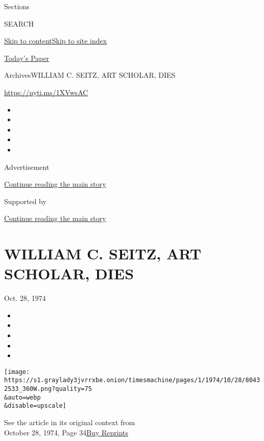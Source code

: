 Sections

SEARCH

\protect\hyperlink{site-content}{Skip to
content}\protect\hyperlink{site-index}{Skip to site index}

\href{https://myaccount.nytimes3xbfgragh.onion/auth/login?response_type=cookie\&client_id=vi}{}

\href{https://www.nytimes3xbfgragh.onion/section/todayspaper}{Today's
Paper}

Archives\textbar{}WILLIAM C. SEITZ, ART SCHOLAR, DIES

\url{https://nyti.ms/1XVwsAC}

\begin{itemize}
\item
\item
\item
\item
\item
\end{itemize}

Advertisement

\protect\hyperlink{after-top}{Continue reading the main story}

Supported by

\protect\hyperlink{after-sponsor}{Continue reading the main story}

\hypertarget{william-c-seitz-art-scholar-dies}{%
\section{WILLIAM C. SEITZ, ART SCHOLAR,
DIES}\label{william-c-seitz-art-scholar-dies}}

Oct. 28, 1974

\begin{itemize}
\item
\item
\item
\item
\item
\end{itemize}

\texttt{[image: https://s1.graylady3jvrrxbe.onion/timesmachine/pages/1/1974/10/28/80432533\_360W.png?quality=75\\\&auto=webp\\\&disable=upscale]}

See the article in its original context from\\
October 28, 1974, Page
34\href{https://store.nytimes3xbfgragh.onion/collections/new-york-times-page-reprints?utm_source=nytimes\&utm_medium=article-page\&utm_campaign=reprints}{Buy
Reprints}

